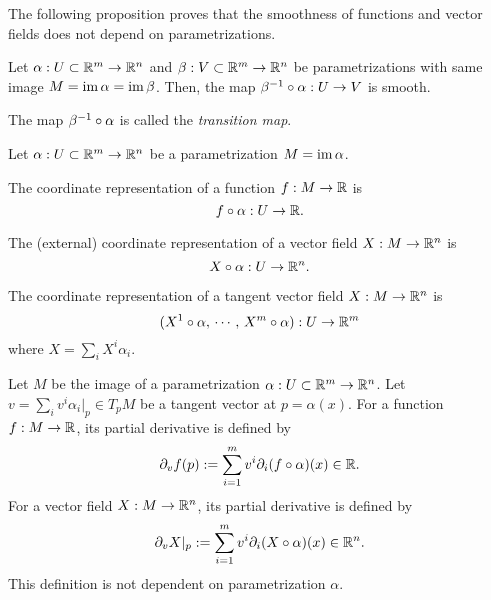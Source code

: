 \documentclass{../exp}
\def\a{\alpha}
\begin{document}
The following proposition proves that the smoothness of functions and vector fields does not depend on parametrizations.

\begin{prop}
Let $\a:U\subset\R^m\to\R^n$ and $\beta:V\subset\R^m\to\R^n$ be parametrizations with same image $M=\im\a=\im\beta$.
Then, the map $\beta^{-1}\o\a:U\to V$ is smooth.
\end{prop}
\begin{pf}
\end{pf}
\begin{rmk}
The map $\beta^{-1}\o\a$ is called the \emph{transition map}.
\end{rmk}

\begin{defn}
Let $\a:U\subset\R^m\to\R^n$ be a parametrization $M=\im\a$.
\begin{cond}
\item The coordinate representation of a function $f:M\to\R$ is
\[f\o\a:U\to\R.\]
\item The (external) coordinate representation of a vector field $X:M\to\R^n$ is
\[X\o\a:U\to\R^n.\]
\item The coordinate representation of a tangent vector field $X:M\to\R^n$ is
\[(X^1\o\a,\,\cdots,\,X^m\o\a):U\to\R^m\]
where $X=\sum_iX^i\a_i$.
\end{cond}
\end{defn}



\begin{defn}
Let $M$ be the image of a parametrization $\a:U\subset\R^m\to\R^n$.
Let $v=\sum_iv^i\a_i|_p\in T_pM$ be a tangent vector at $p=\a(x)$.
For a function $f:M\to\R$, its partial derivative is defined by
\[\pd_vf(p):=\sum_{i=1}^mv^i\pd_i(f\o\a)(x)\in\R.\]
For a vector field $X:M\to\R^n$, its partial derivative is defined by
\[\pd_vX|_p:=\sum_{i=1}^mv^i\pd_i(X\o\a)(x)\in\R^n.\]
This definition is not dependent on parametrization $\a$.
\end{defn}
\end{document}
